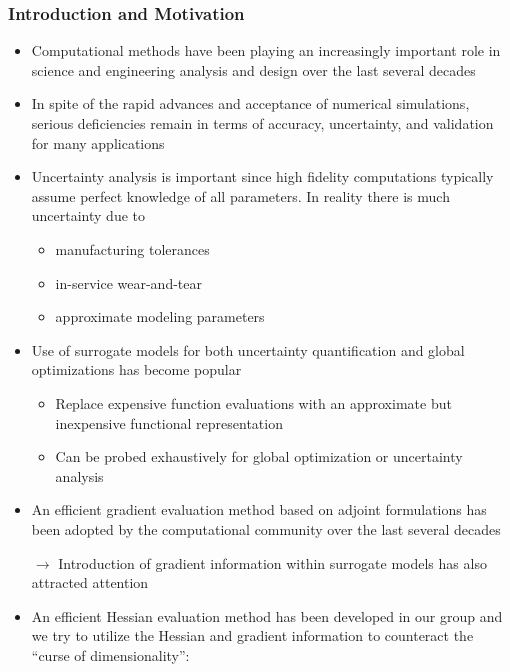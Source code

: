 \documentclass{beamer}
\begin{document}
\begin{frame}[allowframebreaks] \frametitle{Introduction and Motivation}

  \begin{itemize}

  \item Computational methods have been playing an increasingly important role in science and engineering
    analysis and design over the last several decades

  \item In spite of the rapid advances and acceptance of numerical simulations, serious deficiencies 
    remain in terms of accuracy, uncertainty, and validation for many applications

  \item Uncertainty analysis is important since high fidelity computations typically 
    assume perfect knowledge of all parameters. In reality there is much uncertainty due to
    \begin{itemize}
    \item manufacturing tolerances
    \item in-service wear-and-tear
    \item approximate modeling parameters
    \end{itemize}

\newpage

\item Use of surrogate models for both uncertainty quantification and global optimizations has become popular
  \begin{itemize}
  \item Replace expensive function evaluations with an approximate but inexpensive functional representation
  \item Can be probed exhaustively for global optimization or uncertainty analysis
  \end{itemize}

\item An efficient gradient evaluation method based on adjoint formulations has been adopted by the computational community over the last several decades

  $\rightarrow$ Introduction of gradient information within surrogate models has also attracted attention

\newpage

\item An efficient Hessian evaluation method has been developed in our group and we try to utilize the Hessian and gradient information
to counteract the ``curse of dimensionality'':


\end{itemize}
\end{frame}
\end{document}

